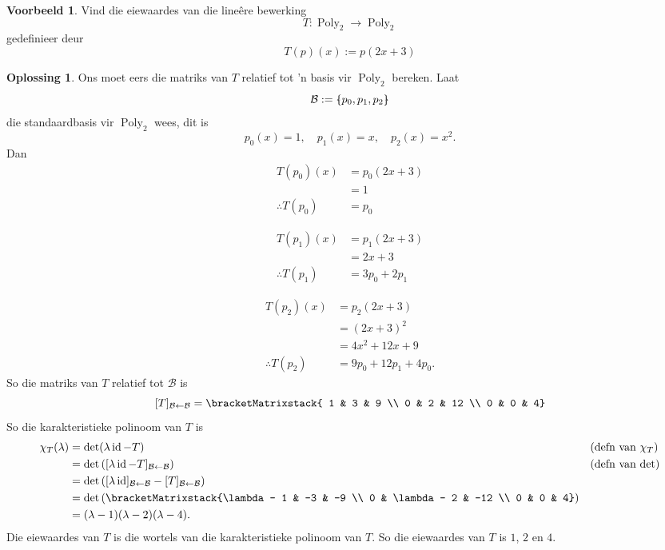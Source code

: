 \documentclass[a4paper,11pt]{book}
\theoremstyle{definition}
\newtheorem{example_environment}{Voorbeeld}[chapter]
\newtheorem*{solution}{Oplossing}
\newcommand{\basis}[1]{{\mathcal #1}}
\newcommand{\cmatrix}[1]{\bracketMatrixstack{#1}}
\newenvironment{example}
	{
		\begin{oframed}
		\begin{example_environment}
	}
	{
		\end{example_environment}
		\end{oframed}
	}
\newcommand{\bmark}{\raisebox{.53ex}{\rule{.2em}{.1ex}}}
\newcommand{\bopen}{{\protect\ooalign{\{\cr\hfil\bmark\hfil\cr}}}
\newcommand{\bclose}{{\protect\ooalign{\}\cr\hfil\bmark\hfil\cr}}}
\DeclareMathOperator{\Poly}{Poly}
\DeclareMathOperator{\id}{id}
\begin{document}
\begin{example} \label{poly-example-eigenvalue} Vind die eiewaardes van die
	line{\^e}re bewerking
	\[
		T : \Poly_2 \rightarrow \Poly_2
	\]
	gedefinieer deur
	\[
		T(p)(x) := p(2x+3)
	\]
	\begin{solution} Ons moet eers die matriks van $T$ relatief tot 'n
		basis vir $\Poly_2$ bereken. Laat 
		\[
			\basis{B} := \bopen p_0, p_1, p_2 \bclose
		\]
		die standaardbasis vir $\Poly_2$ wees, dit is
		\[
			p_0(x) = 1, \quad p_1(x) = x, \quad p_2(x) = x^2.
		\]
		Dan
		\begin{align}
			T(p_0)(x) &= p_0 (2x+3) \nonumber  \\
			&= 1 \nonumber  \\
			\therefore T(p_0) &= p_0 \label{Tp0} 
		\end{align}

		\begin{align}
			T(p_1)(x) &= p_1 (2x+3) \nonumber \\
			&= 2x+3  \nonumber  \\
			\therefore T(p_1) &= 3p_0 + 2p_1 \label{Tp1}
		\end{align}

		\begin{align}
			T(p_2)(x) &= p_2 (2x+3) \nonumber  \\
			&= (2x+3)^2 \nonumber  \\
			&= 4x^2 + 12x + 9 \nonumber \\
			\therefore T(p_2) &= 9p_0 + 12p_1 + 4p_0. \label{Tp2}
		\end{align}
		So die matriks van $T$ relatief tot $\basis{B}$ is
		\[
			[T]_{\basis{B} \leftarrow \basis{B}} = \cmatrix{ 1 & 3 & 9 \\ 0
			& 2 & 12 \\ 0 & 0 & 4}
		\]
		So die karakteristieke polinoom van $T$ is
		\begin{align}
			\chi_T (\lambda) &= \det(\lambda \id - T) && \mbox{(defn van
			$\chi_T$)} \\
			&= \det \left([\lambda \id - T]_{\basis{B} \leftarrow
			\basis{B}} \right) && \mbox{(defn van $\det$)} \\
			&= \det \left( [\lambda \id]_{\basis{B} \leftarrow \basis{B}} -
			[T]_{\basis{B} \leftarrow \basis{B}} \right) \\
			&= \det \left( {\cmatrix{\lambda - 1 & -3 & -9 \\ 0 & \lambda -
			2 & -12 \\ 0 & 0 & 4}} \right) \\
			&= (\lambda - 1)(\lambda - 2)(\lambda - 4).
		\end{align}
		Die eiewaardes van $T$ is die wortels van die karakteristieke
		polinoom van $T$. So die eiewaardes van $T$ is $1$, $2$ en $4$.
	\end{solution}
\end{example}
\end{document}
